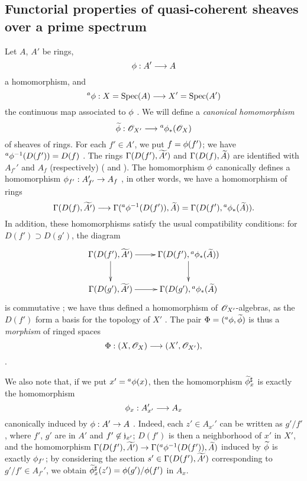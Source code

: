 \subsection{Functorial properties of quasi-coherent sheaves over a prime spectrum}
\label{subsection:func-qcoh-over-spec}

\begin{env}[1.6.1]
\label{1.1.6.1}
Let $A$, $A'$ be rings,
\[
  \vphi:A'\to A
\]
a homomorphism, and
\[
  {}^a\vphi:X=\Spec(A)\to X'=\Spec(A')
\]
the continuous map associated to $\phi$ .
We will define a \emph{canonical homomorphism}
\[
  \wt{\vphi}:\OO_{X'}\to{}^a\vphi_*(\OO_X)
\]
of sheaves of rings.
For each $f'\in A'$, we put $f=\phi(f')$;
we have ${}^a\phi^{-1}(D(f'))=D(f)$ .
The rings $\Gamma(D(f'),{\widetilde{A'}})$ and $\Gamma(D(f),{\widetilde{A}})$ are identified  with $A_{f'}'$ and $A_f$ (respectively) ( and ). The homomorphism $\phi$ canonically defines a homomorphism $\vphi_{f'}:A_{f'}'\to A_f$ , in other words, we have a homomorphism of rings
\[
  \Gamma(D(f),\wt{A'})\to\Gamma({}^a\vphi^{-1}(D(f')),\wt{A})
  =\Gamma(D(f'),{}^a\vphi_*(\wt{A})).
\]
In addition, these homomorphisms satisfy the usual compatibility conditions: for $D(f')\supset D(g')$, the diagram
\[
  \xymatrix{
    \Gamma(D(f'),\wt{A'})\ar[r]\ar[d] &
    \Gamma(D(f'),{}^a\vphi_*(\wt{A}))\ar[d]\\
    \Gamma(D(g'),\wt{A'})\ar[r] &
    \Gamma(D(g'),{}^a\vphi_*(\wt{A})
  }
\]
is commutative ;
we have thus defined a homomorphism of $\mathscr{O}_{X'}$-algebras, as the $D(f')$ form a basis for the topology of $X'$ .
The pair $\Phi=({}^a\phi,{\widetilde{\phi}})$ is thus a \emph{morphism} of ringed spaces
\[
  \Phi:(X,\OO_X)\to(X',\OO_{X'}),
\]
.

We also note that, if we put $x'={}^a\phi(x)$, then the homomorphism ${\widetilde{\phi}}_x^\sharp$  is exactly the homomorphism
\[
  \vphi_x:A_{x'}'\to A_x
\]
canonically induced by $\vphi:A'\to A$ .
Indeed, each $z'\in A_{x'}'$ can be written as $g'/f'$, where $f'$, $g'$ are in $A'$ and $f'\not\in\mathfrak{j}_{x'}$;
$D(f')$ is then a neighborhood of $x'$ in $X'$, and the homomorphism $\Gamma(D(f'),\wt{A'})\to\Gamma({}^a\vphi^{-1}(D(f')),\wt{A})$ induced by ${\widetilde{\phi}}$ is exactly $\phi_{f'}$;
by considering the section $s'\in\Gamma(D(f'),{\widetilde{A'}})$ corresponding to $g'/f'\in A_{f'}'$, we obtain ${\widetilde{\phi}}_x^\sharp(z')=\phi(g')/\phi(f')$ in $A_x$.
\end{env}

